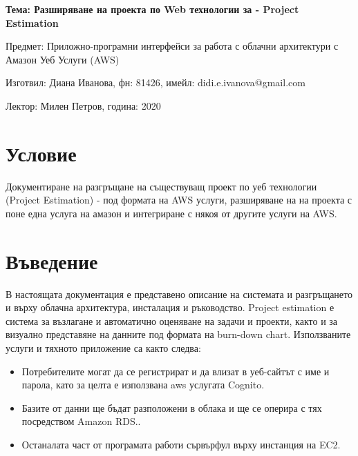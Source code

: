 \documentclass[12pt]{article}
\begin{document}
	\begin{center}
        \LARGE{\textbf{Тема: Разширяване на проекта по Web технологии за - Project Estimation}}
        
        \bigskip
        \Large{Предмет: Приложно-програмни интерфейси за работа с облачни архитектури с Амазон Уеб Услуги (AWS)}
        
        \medskip
        \Large{Изготвил: Диана Иванова, фн: 81426, имейл: didi.e.ivanova@gmail.com}
        
        \medskip
        \Large{Лектор: Милен Петров, година: 2020}
        
        \bigskip
	\end{center}
    
    
   \newpage
    \tableofcontents
    \bigskip
    \bigskip
    \newpage
  
\section{Условие} 

\noindent Документиране на разгръщане на съществуващ проект по уеб технологии (Project Estimation) - под формата на AWS услуги, разширяване на на проекта с поне една услуга на амазон и интегриране с някоя от другите услуги на AWS.

\medskip

\section{Въведение}

 В настоящата документация е представено описание на системата и
разгръщането и върху облачна архитектура, инсталация и ръководство. 
 Project estimation е система за възлагане и автоматично оценяване 
 на задачи и проекти, както и за визуално представяне на данните 
 под формата на burn-down chart. Използваните услуги и тяхното 
 приложение са както следва:  
 

\begin{itemize}
    \item Потребителите могат да се 
 регистрират и да влизат в уеб-сайтът с име и парола, като
 за целта е използвана aws услугата Cognito.
    
    \item  Базите от данни 
 ще бъдат разположени в облака и ще се оперира с тях посредством
 Amazon RDS..
    
    \item Останалата част от програмата работи сървърфул
 върху инстанция на EC2.
\end{itemize}
\end{document}
